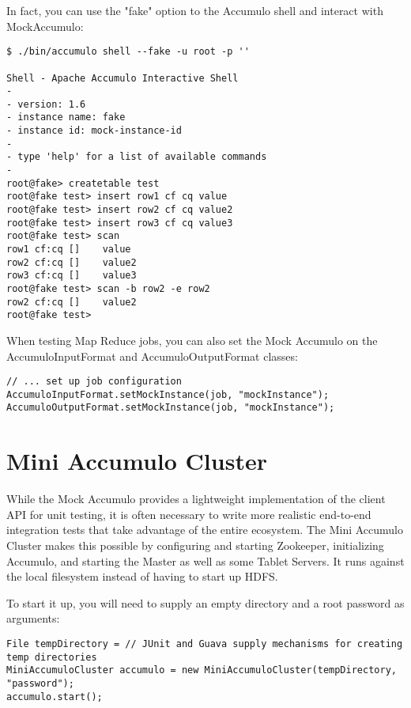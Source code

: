 In fact, you can use the "fake" option to the Accumulo shell and interact with
MockAccumulo:

\begingroup\fontsize{8pt}{8pt}\selectfont\begin{verbatim}
$ ./bin/accumulo shell --fake -u root -p ''

Shell - Apache Accumulo Interactive Shell
-
- version: 1.6
- instance name: fake
- instance id: mock-instance-id
-
- type 'help' for a list of available commands
-
root@fake> createtable test
root@fake test> insert row1 cf cq value
root@fake test> insert row2 cf cq value2
root@fake test> insert row3 cf cq value3
root@fake test> scan
row1 cf:cq []    value
row2 cf:cq []    value2
row3 cf:cq []    value3
root@fake test> scan -b row2 -e row2
row2 cf:cq []    value2
root@fake test>
\end{verbatim}\endgroup

When testing Map Reduce jobs, you can also set the Mock Accumulo on the AccumuloInputFormat
and AccumuloOutputFormat classes:

\begingroup\fontsize{8pt}{8pt}\selectfont\begin{verbatim}
// ... set up job configuration
AccumuloInputFormat.setMockInstance(job, "mockInstance");
AccumuloOutputFormat.setMockInstance(job, "mockInstance");
\end{verbatim}\endgroup

\section{Mini Accumulo Cluster}

While the Mock Accumulo provides a lightweight implementation of the client API for unit
testing, it is often necessary to write more realistic end-to-end integration tests that
take advantage of the entire ecosystem. The Mini Accumulo Cluster makes this possible by
configuring and starting Zookeeper, initializing Accumulo, and starting the Master as well
as some Tablet Servers. It runs against the local filesystem instead of having to start
up HDFS.

To start it up, you will need to supply an empty directory and a root password as arguments:

\begingroup\fontsize{8pt}{8pt}\selectfont\begin{verbatim}
File tempDirectory = // JUnit and Guava supply mechanisms for creating temp directories
MiniAccumuloCluster accumulo = new MiniAccumuloCluster(tempDirectory, "password");
accumulo.start();
\end{verbatim}\endgroup

